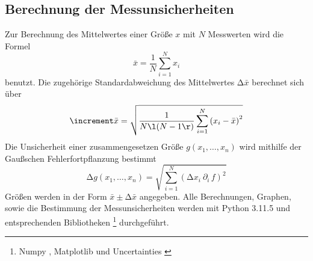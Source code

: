 \subsection{Berechnung der Messunsicherheiten}
\label{sec:Messunsicherheiten}

Zur Berechnung des Mittelwertes einer Größe $x$ mit $N$ Messwerten wird die Formel
%
\begin{equation}
    \bar{x} = \frac{1}{N} \sum_{i=1}^N x_i
\end{equation}
%
benutzt. Die zugehörige Standardabweichung des Mittelwertes $\increment \bar{x}$ berechnet sich über
%
\begin{equation}
    \increment \bar{x} = \sqrt{\frac{1}{N \l(N-1\r)}\sum_{i=1}^N \left(x_i - \bar{x}\right)^2}
\end{equation}
%
Die Unsicherheit einer zusammengesetzen Größe $g\left(x_1, …, x_n\right)$ wird mithilfe der Gaußschen
Fehlerfortpflanzung bestimmt
%
\begin{equation}
    \increment g\left(x_1, …, x_n\right) = \sqrt{\sum_{i=1}^N \left(\increment x_i ~ \partial_i \, f \right)^2}
\end{equation}
%
Größen werden in der Form $\bar{x} \pm \increment \bar{x}$ angegeben. Alle Berechnungen, Graphen, sowie die 
Bestimmung der Messunsicherheiten werden mit Python 3.11.5 und entsprechenden Bibliotheken
\footnote{Numpy \cite{numpy}, Matplotlib \cite{matplotlib} und Uncertainties \cite{uncertainties}} durchgeführt.